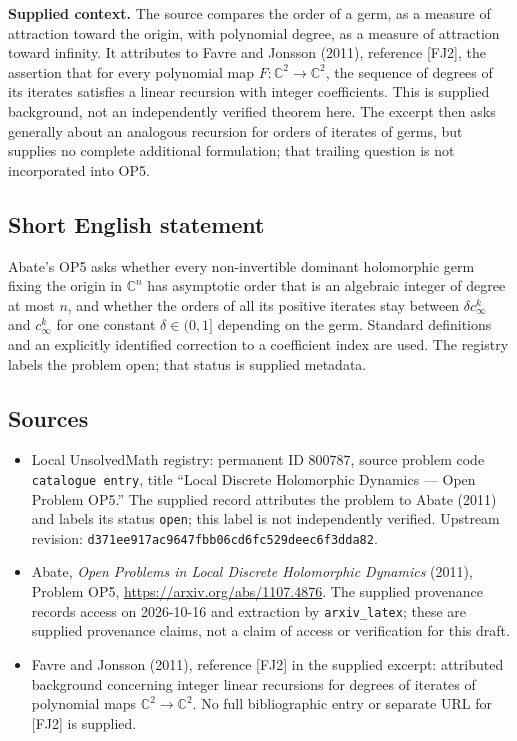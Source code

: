 \documentclass[11pt]{article}
\newcommand{\C}{\mathbb{C}}
\begin{document}
\textbf{Supplied context.} The source compares the order of a germ, as a measure of attraction toward the origin, with polynomial degree, as a measure of attraction toward infinity. It attributes to Favre and Jonsson (2011), reference [FJ2], the assertion that for every polynomial map \(F:\C^2\to\C^2\), the sequence of degrees of its iterates satisfies a linear recursion with integer coefficients. This is supplied background, not an independently verified theorem here. The excerpt then asks generally about an analogous recursion for orders of iterates of germs, but supplies no complete additional formulation; that trailing question is not incorporated into OP5.
\subsection{Short English statement}
Abate's OP5 asks whether every non-invertible dominant holomorphic germ fixing the origin in \(\C^n\) has asymptotic order that is an algebraic integer of degree at most \(n\), and whether the orders of all its positive iterates stay between \(\delta c_\infty^k\) and \(c_\infty^k\) for one constant \(\delta\in(0,1]\) depending on the germ. Standard definitions and an explicitly identified correction to a coefficient index are used. The registry labels the problem open; that status is supplied metadata.
\subsection{Sources}
\begin{itemize}
\item Local UnsolvedMath registry: permanent ID \(800787\), source problem code \texttt{catalogue entry}, title ``Local Discrete Holomorphic Dynamics --- Open Problem OP5.'' The supplied record attributes the problem to Abate (2011) and labels its status \texttt{open}; this label is not independently verified. Upstream revision: \texttt{d371ee917ac9647fbb06cd6fc529deec6f3dda82}.
\item Abate, \emph{Open Problems in Local Discrete Holomorphic Dynamics} (2011), Problem OP5, \url{https://arxiv.org/abs/1107.4876}. The supplied provenance records access on 2026-10-16 and extraction by \texttt{arxiv\_latex}; these are supplied provenance claims, not a claim of access or verification for this draft.
\item Favre and Jonsson (2011), reference [FJ2] in the supplied excerpt: attributed background concerning integer linear recursions for degrees of iterates of polynomial maps \(\C^2\to\C^2\). No full bibliographic entry or separate URL for [FJ2] is supplied.
\end{itemize}
\end{document}

